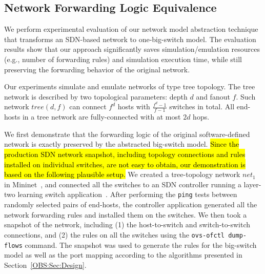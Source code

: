 \subsection{Network Forwarding Logic Equivalence}
\label{OBS:SubSec:PreserveForwardingLogic}
We perform experimental evaluation of our network model abstraction technique
that transforms an SDN-based network to one-big-switch model.
The evaluation results show that our approach significantly saves simulation/emulation resources
(e.g., number of forwarding rules) and simulation execution time,
while still preserving the forwarding behavior of the original network.

Our experiments simulate and emulate networks of type tree topology.
The tree network is described by two topological parameters: depth $d$ and fanout $f$.
Such network $tree(d, f)$ can connect $f^d$ hosts with $\frac{f^d - 1}{f-1}$ switches in total.
All end-hosts in a tree network are fully-connected with at most $2d$ hops.


We first demonstrate that the forwarding logic of the original software-defined network is exactly preserved by the abstracted big-switch model.
\hl{
Since the production SDN network snapshot, including topology connections and rules installed on
individual switches, are not easy to obtain, our demonstration is based on the following plausible setup.
}
\fi
We created a tree-topology network $net_1$ in Mininet~\cite{Mininet},
and connected all the switches to an SDN controller running a layer-two learning switch application~\cite{Pox}.
After performing the \texttt{ping} tests between randomly selected pairs of end-hosts,
the controller application generated all the network forwarding rules and installed them on the switches.
We then took a snapshot of the network, including (1) the host-to-switch and switch-to-switch connections,
and (2) the rules on all the switches using the \texttt{ovs-ofctl dump-flows} command. The snapshot was used to generate the rules for the big-switch model as well as the port mapping according to the algorithms presented in Section~\ref{OBS:Sec:Design}.

